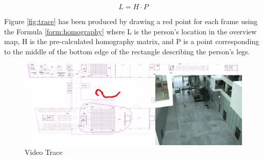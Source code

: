 \begin{equation}
	L = H \cdot P
	\label{form:homography}
\end{equation}

Figure \ref{fig:trace} has been produced by drawing a red point for each frame using the Formula \ref{form:homography} where L is the person's location in the overview map, H is the pre-calculated homography matrix, and P is a point corresponding to the middle of the bottom edge of the rectangle describing the person's legs.

\begin{figure}[h!]
	\centering
	\includegraphics[width=\textwidth]{Handin2/images/personlocationvideo.png}
	\caption{Video Trace}
	\label{fig:video_trace}
\end{figure}